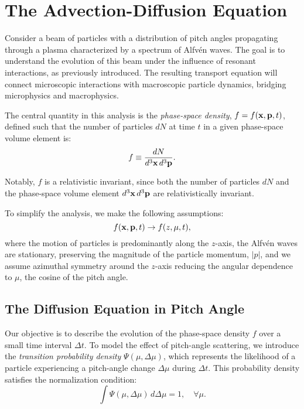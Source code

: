 \section{The Advection-Diffusion Equation}

Consider a beam of particles with a distribution of pitch angles propagating through a plasma characterized by a spectrum of Alfvén waves. The goal is to understand the evolution of this beam under the influence of resonant interactions, as previously introduced. The resulting transport equation will connect microscopic interactions with macroscopic particle dynamics, bridging microphysics and macrophysics.

The central quantity in this analysis is the \emph{phase-space density}, \( f = f(\vb{x}, \vb{p}, t) \), defined such that the number of particles \( dN \) at time \( t \) in a given phase-space volume element is:
\[
f \equiv \frac{dN}{d^3 \vb{x} \, d^3 \vb{p}}.
\]

Notably, \( f \) is a relativistic invariant, since both the number of particles \( dN \) and the phase-space volume element \( d^3 \vb{x} \, d^3 \vb{p} \) are relativistically invariant.

To simplify the analysis, we make the following assumptions:
\[
f(\vb{x}, \vb{p}, t) \rightarrow f(z, \mu, t),
\]
where the motion of particles is predominantly along the \( z \)-axis, the Alfvén waves are stationary, preserving the magnitude of the particle momentum, \( |p| \), and we assume azimuthal symmetry around the \( z \)-axis reducing the angular dependence to \( \mu \), the cosine of the pitch angle.

\subsection{The Diffusion Equation in Pitch Angle}

Our objective is to describe the evolution of the phase-space density \( f \) over a small time interval \( \Delta t \). To model the effect of pitch-angle scattering, we introduce the \emph{transition probability density} \( \Psi(\mu, \Delta\mu) \), which represents the likelihood of a particle experiencing a pitch-angle change \( \Delta\mu \) during \( \Delta t \). 
%
This probability density satisfies the normalization condition:
\begin{equation}\label{eq:normpsi}
\int \Psi(\mu, \Delta\mu) \, d\Delta\mu = 1, \quad \forall \mu.
\end{equation}

